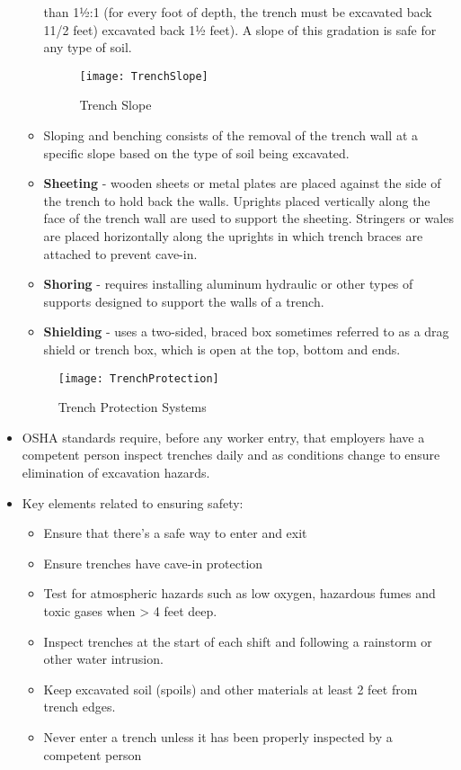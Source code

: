 \begin{itemize}
\begin{itemize}
than 1½:1 (for every foot of depth, the trench must be excavated back 1\small{1/2} feet)
excavated back 1½ feet). A slope of this gradation is safe for any type of soil.
\begin{figure}[H]
\begin{center}
\texttt{[image: TrenchSlope]}
\caption{Trench Slope}
\end{center}
\end{figure}
\item Sloping and benching consists of the removal of the trench wall at a specific slope based on the type of soil being excavated.
\item \textbf{Sheeting} - wooden sheets or metal plates are placed against the side of the trench to hold back the walls. Uprights placed vertically along the face of the trench wall are used to support the sheeting. Stringers or wales are placed horizontally along the uprights in which trench braces are attached to prevent cave-in.
\item \textbf{Shoring} - requires installing aluminum hydraulic or other types of supports designed to support the walls of a trench.
\item \textbf{Shielding} -  uses a two-sided, braced box sometimes referred to as a drag shield or trench box, which is open at the top, bottom and ends.
\end{itemize}
\begin{figure}[H]
\begin{center}
\texttt{[image: TrenchProtection]}
\caption{Trench Protection Systems}
\end{center}
\end{figure}
\item OSHA standards require, before any worker entry, that employers have a competent person
inspect trenches daily and as conditions change to ensure elimination of excavation hazards. 
\item Key elements related to ensuring safety:
\begin{itemize}
\item Ensure that there's a safe way to enter and exit
\item Ensure trenches have cave-in protection
\item Test for atmospheric hazards such as low oxygen, hazardous fumes and toxic gases when > 4 feet deep.
\item Inspect trenches at the start of each shift and following a rainstorm or
other water intrusion.
\item Keep excavated soil (spoils) and other materials at least 2 feet from trench edges.
\item Never enter a trench unless it has been properly inspected by a competent person
\end{itemize}

\end{itemize}

